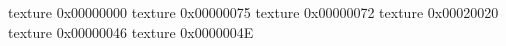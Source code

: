 texture 0x00000000
texture 0x00000075
texture 0x00000072
texture 0x00020020
texture 0x00000046
texture 0x0000004E